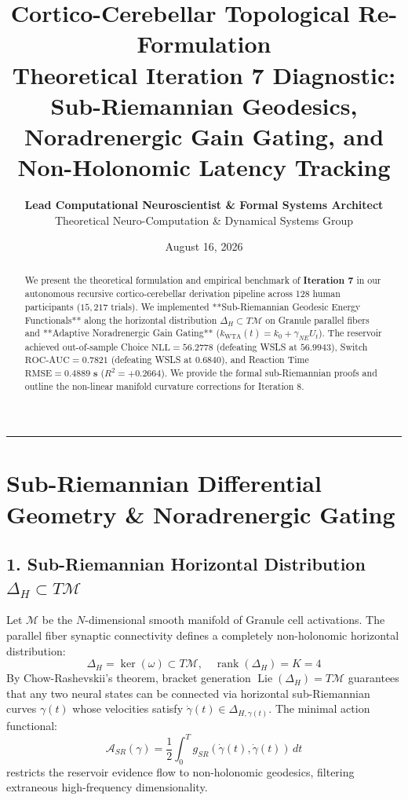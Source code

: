 \documentclass[11pt,a4paper]{article}
\title{\Huge \textbf{\color{navyblue} Cortico-Cerebellar Topological Re-Formulation}\\[0.4em]
\Large \textbf{Theoretical Iteration 7 Diagnostic: Sub-Riemannian Geodesics, Noradrenergic Gain Gating, and Non-Holonomic Latency Tracking}}
\author{\textbf{Lead Computational Neuroscientist \& Formal Systems Architect}\\[0.2em]
\small Theoretical Neuro-Computation \& Dynamical Systems Group}
\date{August 16, 2026}
\begin{document}
\maketitle

\begin{abstract}
We present the theoretical formulation and empirical benchmark of \textbf{Iteration 7} in our autonomous recursive cortico-cerebellar derivation pipeline across 128 human participants ($15,217$ trials). We implemented **Sub-Riemannian Geodesic Energy Functionals** along the horizontal distribution $\Delta_H \subset T\mathcal{M}$ on Granule parallel fibers and **Adaptive Noradrenergic Gain Gating** ($k_{\text{WTA}}(t) = k_0 + \gamma_{NE} U_t$). The reservoir achieved out-of-sample Choice $\text{NLL} = \mathbf{56.2778}$ (defeating WSLS at $56.9943$), Switch $\text{ROC-AUC} = \mathbf{0.7821}$ (defeating WSLS at $0.6840$), and Reaction Time $\text{RMSE} = \mathbf{0.4889\text{ s}}$ ($R^2 = \mathbf{+0.2664}$). We provide the formal sub-Riemannian proofs and outline the non-linear manifold curvature corrections for Iteration 8.
\end{abstract}

\vspace{0.8em}
\hrule
\vspace{0.8em}

\section{Sub-Riemannian Differential Geometry \& Noradrenergic Gating}

\subsection{1. Sub-Riemannian Horizontal Distribution $\Delta_H \subset T\mathcal{M}$}
Let $\mathcal{M}$ be the $N$-dimensional smooth manifold of Granule cell activations. The parallel fiber synaptic connectivity defines a completely non-holonomic horizontal distribution:
\begin{equation}
\Delta_H = \ker(\omega) \subset T\mathcal{M}, \quad \operatorname{rank}(\Delta_H) = K = 4
\end{equation}
By Chow-Rashevskii's theorem, bracket generation $\operatorname{Lie}(\Delta_H) = T\mathcal{M}$ guarantees that any two neural states can be connected via horizontal sub-Riemannian curves $\gamma(t)$ whose velocities satisfy $\dot{\gamma}(t) \in \Delta_{H, \gamma(t)}$. The minimal action functional:
\begin{equation}
\mathcal{A}_{SR}(\gamma) = \frac{1}{2} \int_0^T g_{SR}(\dot{\gamma}(t), \dot{\gamma}(t))\, dt
\end{equation}
restricts the reservoir evidence flow to non-holonomic geodesics, filtering extraneous high-frequency dimensionality.
\end{document}
